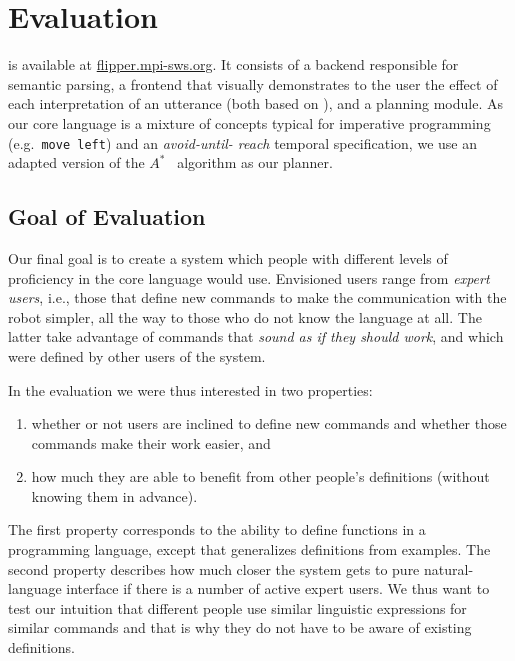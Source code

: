 \section{Evaluation}

\tool is available at \url{flipper.mpi-sws.org}. It consists of a backend
responsible for semantic parsing, a frontend that visually demonstrates to the user the effect of each interpretation of an utterance (both based on \cite{wangVoxelurn}), and a planning module.
As our core language is a mixture of concepts typical for
imperative programming (e.g.\ \lstinline{move left}) and an \textit{avoid-until-
reach} temporal specification, we use an adapted version of the
$A^*$~\cite{hipsterHeuristicPlanner} algorithm as our planner. 

\subsection{Goal of Evaluation}
Our final goal is to create a system which people with different levels of
proficiency in the core language would use. Envisioned users range from
\emph{expert users}, i.e., those that define new commands to make the
communication with the robot simpler, all the way to those who do not know the
language at all. The latter take advantage of commands that \emph{sound as if they
should work}, and which were defined by other users of the system.

In the evaluation we were thus interested in two properties:
\begin{enumerate}
	\item whether or not users are inclined to define new commands and whether
		those commands make their work easier, and
	\item how much they are able to benefit from other people's definitions
		(without knowing them in advance).
\end{enumerate}
The first property corresponds to the ability to define functions in a programming language,
except that \tool generalizes definitions from examples. The second property
describes how much closer the system gets to pure natural-language interface if
there is a number of active expert users. We thus want to test our intuition
that different people use similar linguistic expressions for similar commands
and that is why they do not have to be aware of existing definitions.

